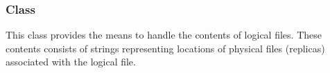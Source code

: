  
 
 
  \subsubsection*{Class }
 
    This class provides the means to handle the contents
    of logical files.  These contents consists of strings
    representing locations of physical files (replicas)
    associated with the logical file.  
 
